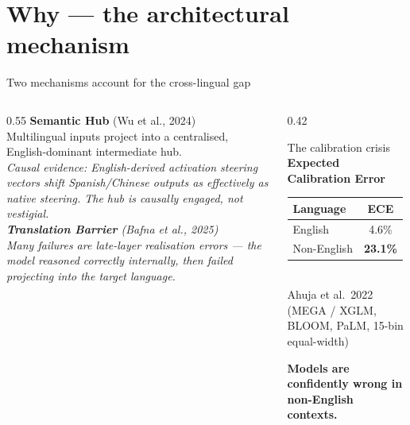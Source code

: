 \documentclass[11pt,aspectratio=169]{beamer}
\newcommand{\takeaway}[1]{%
  \begin{center}
    \colorbox{rsnavy!10}{%
      \begin{minipage}{0.92\textwidth}
        \centering\textbf{#1}
      \end{minipage}}
  \end{center}}
\begin{document}
\section{Why --- the architectural mechanism}

\begin{frame}{Two mechanisms account for the cross-lingual gap}
    \large
    \begin{columns}[T]
        \begin{column}{0.55\textwidth}
            \textbf{Semantic Hub} \scriptsize (Wu et al., 2024)\\[4pt]
            \normalsize Multilingual inputs project into a centralised, English-dominant intermediate hub.\\[6pt]
            \footnotesize\itshape Causal evidence: English-derived activation steering vectors shift Spanish/Chinese outputs as effectively as native steering. The hub is causally engaged, not vestigial.
            \vspace{0.4cm}\\
            \textbf{Translation Barrier} \scriptsize (Bafna et al., 2025)\\[4pt]
            \normalsize Many failures are \emph{late-layer realisation} errors --- the model reasoned correctly internally, then failed projecting into the target language.
        \end{column}
        \begin{column}{0.42\textwidth}
            \begin{block}{The calibration crisis}
                \centering
                \large \textbf{Expected Calibration Error}\\[6pt]
                \begin{tabular}{lc}
                    \toprule
                    \textbf{Language} & \textbf{ECE} \\
                    \midrule
                    English      & 4.6\% \\
                    Non-English  & \textcolor{rsclaret}{\textbf{23.1\%}} \\
                    \bottomrule
                \end{tabular}\\[6pt]
                \scriptsize Ahuja et al.\ 2022 (MEGA / XGLM, BLOOM, PaLM, 15-bin equal-width)
            \end{block}
            \vspace{0.2cm}
            \takeaway{Models are confidently wrong in non-English contexts.}
        \end{column}
    \end{columns}
\end{frame}
\end{document}
